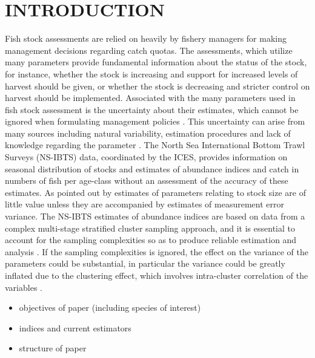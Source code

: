 \documentclass[a4paper 12pt]{article}
\numberwithin{equation}{section}
\begin{document}
\section{\large INTRODUCTION}
Fish stock assessments are relied on heavily by fishery managers for making management decisions regarding catch quotas. The assessments, which utilize many parameters provide fundamental information about the status of the stock, for instance, whether the stock is increasing and support for increased levels of harvest should be given, or whether the stock is decreasing and stricter control on harvest should be implemented. Associated with the many parameters used in fish stock assessment is the uncertainty about their estimates, which cannot be ignored when formulating management policies \citep{walters1981effects, ludwig1981measurement}. This uncertainty can arise from many sources including natural variability, estimation procedures and lack of knowledge regarding the parameter \citep{ehrhardt1997role}. The North Sea International Bottom Trawl Surveys (NS-IBTS) data, coordinated by the ICES, provides information on seasonal distribution of stocks and estimates of abundance indices and catch in numbers of fish per age-class without an assessment of the accuracy of these estimates.  As pointed out by  \citet{ludwig1981measurement} estimates of parameters relating to stock size are of little value unless they are accompanied by estimates of measurement error variance. The NS-IBTS estimates of abundance indices are based on data from a complex multi-stage stratified cluster sampling approach,  and  it is essential to account for the sampling complexities so as to produce reliable estimation and analysis \citep{lehtonen2004practical}. If the sampling complexities is ignored, the effect on the variance  of the parameters could be substantial, in  particular the variance could be greatly inflated  due to the clustering effect, which involves intra-cluster correlation of the variables \citep{lehtonen2004practical, aanes2015efficient}. 

 \begin{itemize}
 \item objectives of paper (including species of interest)
 \item indices and current estimators
 \item structure of paper
 \end{itemize}
\end{document}
